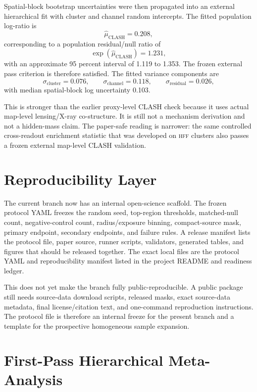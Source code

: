 \documentclass[11pt,a4paper]{article}
\newcommand{\HFF}{\textsc{hff}}
\begin{document}
Spatial-block bootstrap uncertainties were then propagated into an external
hierarchical fit with cluster and channel random intercepts. The fitted
population log-ratio is
\[
\hat{\mu}_{\mathrm{CLASH}}=0.208,
\]
corresponding to a population residual/null ratio of
\[
\exp(\hat{\mu}_{\mathrm{CLASH}})=1.231,
\]
with an approximate 95 percent interval of 1.119 to 1.353. The frozen external
pass criterion is therefore satisfied. The fitted variance components are
\[
\sigma_{\mathrm{cluster}}=0.076,\qquad
\sigma_{\mathrm{channel}}=0.118,\qquad
\sigma_{\mathrm{residual}}=0.026,
\]
with median spatial-block log uncertainty 0.103.

This is stronger than the earlier proxy-level CLASH check because it uses
actual map-level lensing/X-ray co-structure. It is still not a mechanism
derivation and not a hidden-mass claim. The paper-safe reading is narrower:
the same controlled cross-readout enrichment statistic that was developed on
\HFF{} clusters also passes a frozen external map-level CLASH validation.

\section{Reproducibility Layer}

The current branch now has an internal open-science scaffold. The frozen
protocol YAML freezes the random seed, top-region thresholds, matched-null
count, negative-control count, radius/exposure binning, compact-source mask,
primary endpoint, secondary endpoints, and failure rules. A release manifest
lists the protocol file, paper source, runner scripts, validators, generated
tables, and figures that should be released together. The exact local files are
the protocol YAML and reproducibility manifest listed in the project README and
readiness ledger.

This does not yet make the branch fully public-reproducible. A public package
still needs source-data download scripts, released masks, exact source-data
metadata, final license/citation text, and one-command reproduction
instructions. The protocol file is therefore an internal freeze for the present
branch and a template for the prospective homogeneous sample expansion.

\section{First-Pass Hierarchical Meta-Analysis}
\end{document}
